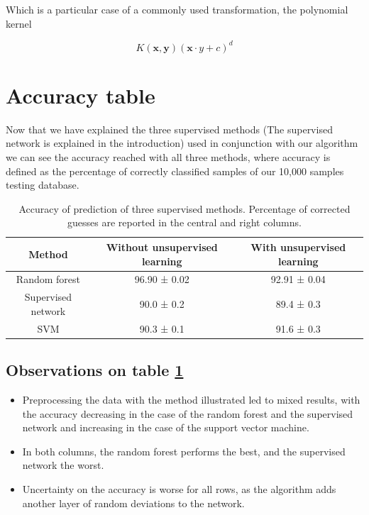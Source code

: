 \documentclass[a4paper]{report}
\begin{document}
Which is a particular case of a commonly used transformation, the polynomial kernel

\begin{equation}
	K(\textbf{x},\textbf{y})(\textbf{x}\cdot{y}+c)^d
\end{equation}

\section{Accuracy table}

Now that we have explained the three supervised methods (The supervised network is explained in the introduction) used in conjunction with our algorithm we can see the accuracy reached with all three methods, where accuracy is defined as the percentage of correctly classified samples of our 10,000 samples testing database.

\begin{table}[h!]
  \begin{center}
    \begin{tabular}{c|c|c} %
      \textbf{Method} & \textbf{Without unsupervised learning} & \textbf{With unsupervised learning}\\
      \hline
      Random forest & 96.90  ± 0.02 & 92.91 ± 0.04\\
      Supervised network & 90.0 ± 0.2 & 89.4 ± 0.3 \\
      SVM & 90.3 ± 0.1 & 91.6 ± 0.3 \\
    \end{tabular}
  \end{center}
  \caption{Accuracy of prediction of three supervised methods. Percentage of corrected guesses are reported in the central and right columns.}
  \label{bbb}
\end{table}

\subsection{Observations on table \ref{bbb}}

\begin{itemize}
    \item Preprocessing the data with the method illustrated led to mixed results, with the accuracy decreasing in the case of the random forest and the supervised network and increasing in the case of the support vector machine.
    \item In both columns, the random forest performs the best, and the supervised network the worst.
    \item Uncertainty on the accuracy is worse for all rows, as the algorithm adds another layer of random deviations to the network.
\end{itemize}
\end{document}
